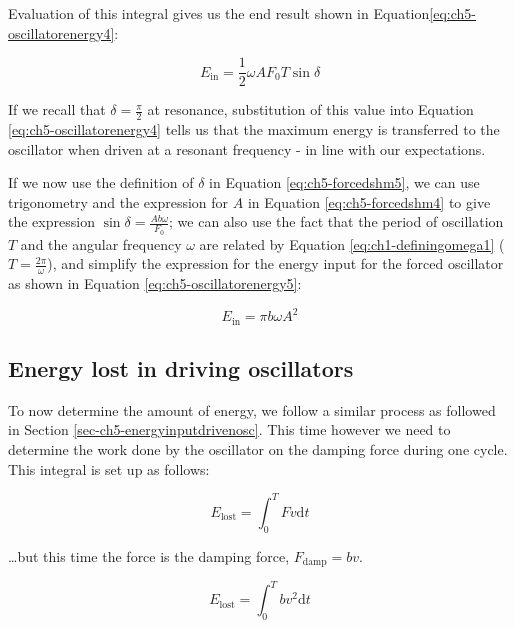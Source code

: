 \documentclass[
]{book}
\begin{document}
Evaluation of this integral gives us the end result shown in Equation\eqref{eq:ch5-oscillatorenergy4}:

\begin{equation}
E_{\mathrm{in}} = \frac{1}{2}\omega A F_0 T \sin \delta
\label{eq:ch5-oscillatorenergy4}
\end{equation}

If we recall that \(\delta = \frac{\pi}{2}\) at resonance, substitution of this value into Equation \eqref{eq:ch5-oscillatorenergy4} tells us that the maximum energy is transferred to the oscillator when driven at a resonant frequency - in line with our expectations.

If we now use the definition of \(\delta\) in Equation \eqref{eq:ch5-forcedshm5}, we can use trigonometry and the expression for \(A\) in Equation \eqref{eq:ch5-forcedshm4} to give the expression \(\sin \delta = \frac{Ab\omega}{F_0}\); we can also use the fact that the period of oscillation \(T\) and the angular frequency \(\omega\) are related by Equation \eqref{eq:ch1-definingomega1} (\(T = \frac{2\pi}{\omega}\)), and simplify the expression for the energy input for the forced oscillator as shown in Equation \eqref{eq:ch5-oscillatorenergy5}:

\begin{equation}
E_{\mathrm{in}} = \pi b \omega A^2
\label{eq:ch5-oscillatorenergy5}
\end{equation}

\hypertarget{sec-ch5-energylostdrivenosc}{%
\subsection{Energy lost in driving oscillators}\label{sec-ch5-energylostdrivenosc}}

To now determine the amount of energy, we follow a similar process as followed in Section \ref{sec-ch5-energyinputdrivenosc}. This time however we need to determine the work done by the oscillator on the damping force during one cycle. This integral is set up as follows:

\begin{equation}
E_{\mathrm{lost}} = \int_0^T F v \mathrm{d}t
\end{equation}

\ldots but this time the force is the damping force, \(F_{\mathrm{damp}} = bv\).

\begin{equation}
E_{\mathrm{lost}} = \int_0^T b v^2 \mathrm{d}t
\end{equation}
\end{document}
